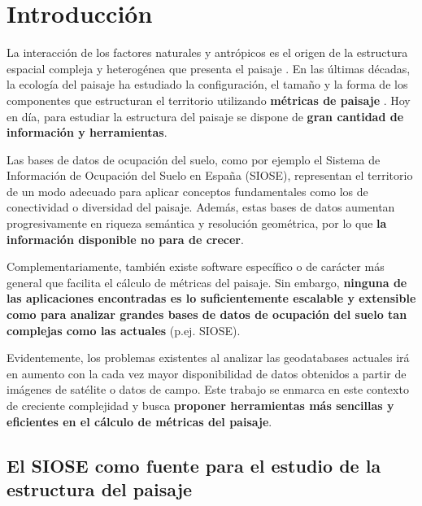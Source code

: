 
\chapter{Introducción}\label{chap:intro}

La interacción de los factores naturales y antrópicos es el origen de la estructura espacial compleja y heterogénea que presenta el paisaje \citep{Forman1986,Turner2001}. En las últimas décadas, la ecología del paisaje ha estudiado la configuración, el tamaño y la forma de los componentes que estructuran el territorio utilizando \textbf{métricas de paisaje} \citep{Aguilera2010}. Hoy en día, para estudiar la estructura del paisaje se dispone de \textbf{gran cantidad de información y herramientas}. 

Las bases de datos de ocupación del suelo, como por ejemplo el Sistema de Información de Ocupación del Suelo en España (SIOSE), representan el territorio de un modo adecuado para aplicar conceptos fundamentales como los de conectividad o diversidad del paisaje. Además, estas bases de datos aumentan progresivamente en riqueza semántica y resolución geométrica, por lo que \textbf{la información disponible no para de crecer}.

Complementariamente, también existe software específico o de carácter más general que facilita el cálculo de métricas del paisaje. Sin embargo, \textbf{ninguna de las aplicaciones encontradas es lo suficientemente escalable y extensible como para analizar grandes bases de datos de ocupación del suelo tan complejas como las actuales} (p.ej. SIOSE). 

Evidentemente, los problemas existentes al analizar las geodatabases actuales irá en aumento con la cada vez mayor disponibilidad de datos obtenidos a partir de imágenes de satélite o datos de campo. Este trabajo se enmarca en este contexto de creciente complejidad y busca \textbf{proponer herramientas más sencillas y eficientes en el cálculo de métricas del paisaje}.


\section{El SIOSE como fuente para el estudio de la estructura del paisaje}\label{sec:siose}

